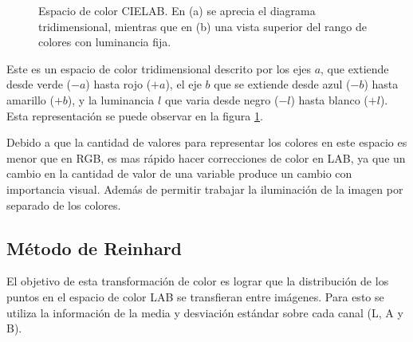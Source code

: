 \begin{figure}[h]
	\centering     %
	
	\caption[Espacio de color CIELAB]{Espacio de color CIELAB. En (a) se aprecia el diagrama tridimensional, mientras que en (b) una vista superior del rango de colores con luminancia fija.}
	\label{imagen:lab-color}
\end{figure}

Este es un espacio de color tridimensional descrito por los ejes $a$, que extiende desde verde ($-a$) hasta rojo ($+a$), el eje $b$ que se extiende desde azul ($-b$) hasta amarillo ($+b$), y la luminancia $l$ que varia desde negro ($-l$) hasta blanco ($+l$). Esta representación se puede observar en la figura \ref{imagen:lab-color}.

Debido a que la cantidad de valores para representar los colores en este espacio es menor que en RGB, es mas rápido hacer correcciones de color en LAB, ya que un cambio en la cantidad de valor de una variable produce un cambio con importancia visual. Además de permitir trabajar la iluminación de la imagen por separado de los colores.

\subsection{Método de Reinhard}
El objetivo de esta transformación de color es lograr que la distribución de los puntos en el espacio de color LAB se transfieran entre imágenes. Para esto se utiliza la información de la media y desviación estándar sobre cada canal (L, A y B).

